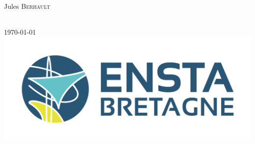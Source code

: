 \documentclass[12pt]{article}
\begin{document}
\begin{titlepage}
\begin{minipage}{0.4\textwidth}
        \begin{flushleft} \large
            Jules \textsc{Berhault}\\  %
            \end{flushleft}
\end{minipage}\\[1cm]
{\large \today}\\[1cm] %
\includegraphics{ENSTA1246-524.png}%
\vfill %

\end{titlepage}

\tableofcontents          %
\listoffigures
\listoftables
\newpage



\end{document}
